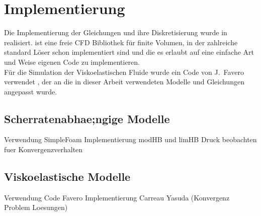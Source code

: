 \section{Implementierung}
\label{Kapitel:Implementierung}
Die Implementierung der Gleichungen und ihre Diskretisierung wurde in \openfoam{} \cite{openfoam} realisiert.
\openfoam{} ist eine freie CFD Bibliothek für finite Volumen, in der zahlreiche standard Löser schon implementiert sind und die es erlaubt auf eine einfache Art und Weise eigenen Code zu implementieren.\\
Für die Simulation der Viskoelastischen Fluide wurde ein Code von J.~Favero verwendet \cite{faveroOF}, der an die in dieser Arbeit verwendeten Modelle und Gleichungen angepasst wurde.
%
\subsection{Scherratenabhae;ngige Modelle}
\begin{todocontent}
    \1 Verwendung SimpleFoam
    \1 Implementierung modHB und limHB
    \1 Druck beobachten fuer Konvergenzverhalten
\end{todocontent}
%
\subsection{Viskoelastische Modelle}
\begin{todocontent}
    \1 Verwendung Code Favero
    \1 Implementierung Carreau Yasuda
    \1 (Konvergenz Problem Loesungen)
\end{todocontent}
